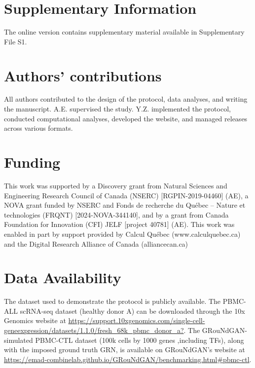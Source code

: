 \begin{tcolorbox}
\section*{Supplementary Information}

The online version contains supplementary material available in Supplementary File S1.

\section*{Authors’ contributions}

All authors contributed to the design of the protocol, data analyses, and writing the manuscript.
A.E. supervised the study. Y.Z. implemented the protocol, conducted computational analyses,
developed the website, and managed releases across various formats.

\section*{Funding}

This work was supported by a Discovery grant from Natural Sciences and Engineering Research
Council of Canada (NSERC) [RGPIN-2019-04460] (AE), a NOVA grant funded by NSERC and Fonds
de recherche du Québec – Nature et technologies (FRQNT) [2024-NOVA-344140], and by a grant
from Canada Foundation for Innovation (CFI) JELF [project 40781] (AE). This work was enabled in
part by support provided by Calcul Québec (www.calculquebec.ca) and the Digital Research
Alliance of Canada (alliancecan.ca)

\section*{Data Availability}

The dataset used to demonstrate the protocol is publicly available. The PBMC-ALL scRNA-seq
dataset (healthy donor A) can be downloaded through the 10x Genomics website at
\url{https://support.10xgenomics.com/single-cell-geneexpression/datasets/1.1.0/fresh_68k_pbmc_donor_a?}. The GRouNdGAN-simulated PBMC-CTL
dataset (100k cells by 1000 genes ,including TFs), along with the imposed ground truth GRN, is
available on GRouNdGAN’s website at \url{https://emad-combinelab.github.io/GRouNdGAN/benchmarking.html#pbmc-ctl}.


\end{tcolorbox}

